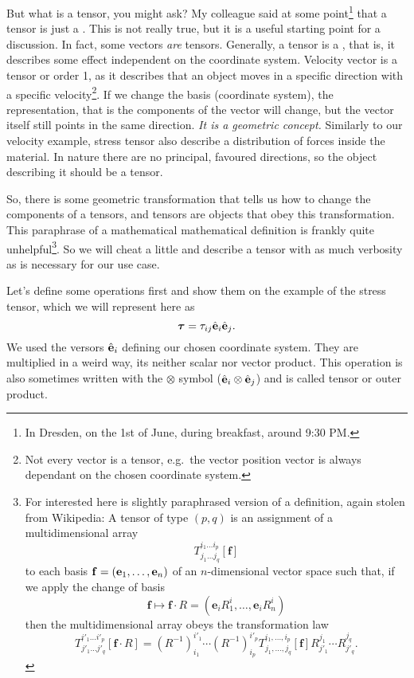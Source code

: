 \documentclass{article}
\begin{document}
But what is a tensor, you might ask? My colleague said at some point\footnote{In Dresden, on the 1st of June, during breakfast, around 9:30 PM.} that a tensor
is just a . This is not really true, but it is a useful starting point for a discussion. 
In fact, some vectors 
\emph{are} tensors. Generally, a tensor is a , that is,
it describes some effect independent on the coordinate system. Velocity vector
is a tensor or order 1, as it describes that an object moves in a specific direction 
with a specific velocity\footnote{Not every vector is a tensor, e.g.\ the vector
position vector is always dependant on the chosen coordinate system.}. If we
change the basis (coordinate system), the representation, that is the components 
of the vector will change, but the vector itself still points in the same 
direction. \emph{It is a geometric concept.} Similarly to our velocity example, 
stress tensor also describe a distribution of forces inside the material. In 
nature there are no principal, favoured directions, so the object describing it 
should be a tensor.

So, there is some geometric transformation
that tells us how to change the components of a tensors, and tensors 
are objects that obey this transformation. 
This paraphrase of a mathematical mathematical definition is
frankly quite unhelpful\footnote{%
For interested here is slightly paraphrased version of a definition, 
again stolen from Wikipedia: A tensor of type \((p,q)\) is an assignment 
of a multidimensional array
\[
  T^{i_1\dots i_p}_{j_{1}\dots j_{q}}[\mathbf{f}]
\]
to each basis \(\vb{f} = (\vb{e}_1, \dots, \vb{e}_n)\) of an \(n\)-dimensional 
vector space such that, if we apply the change of basis
\[
  \mathbf{f}\mapsto \mathbf{f}\cdot R = \left( \mathbf{e}_i R^i_1, \dots, \mathbf{e}_i R^i_n \right)
\]
then the multidimensional array obeys the transformation law
\[
  T^{i'_1\dots i'_p}_{j'_1\dots j'_q}[\mathbf{f} \cdot R] = \left(R^{-1}\right)^{i'_1}_{i_1} \cdots \left(R^{-1}\right)^{i'_p}_{i_p}
  T^{i_1, \ldots, i_p}_{j_1, \ldots, j_q}[\mathbf{f}]
  R^{j_1}_{j'_1}\cdots R^{j_q}_{j'_q} .
\]
}.
So we will cheat a little 
and describe a tensor with as much verbosity as is necessary for our use case.

Let's define some operations first and show them on the example of the stress 
tensor, which we will represent here as
\[
  \bm{\tau} = \tau_{ij}\hat{\vb{e}}_i \hat{\vb{e}}_j.
\]
We used the versors \(\hat{\vb{e}}_i\) defining our chosen coordinate system. 
They are multiplied in a weird way, its neither scalar nor vector product. This 
operation is also sometimes written with 
the \(\otimes\) symbol (\(\hat{\vb{e}}_i \otimes \hat{\vb{e}}_j\)) and 
is called tensor or outer product.
\end{document}
